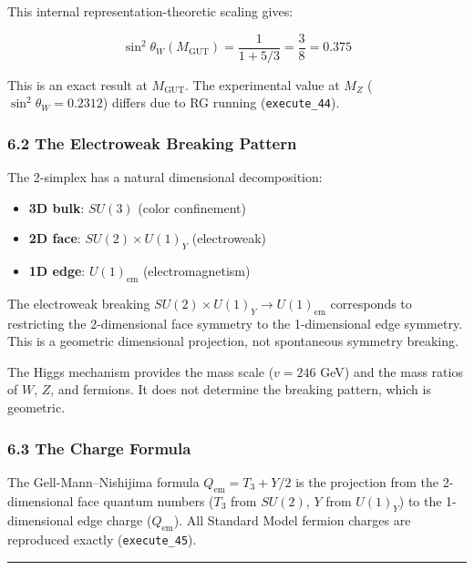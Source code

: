 \documentclass[
]{article}
\providecommand{\tightlist}{%
  \setlength{\itemsep}{0pt}\setlength{\parskip}{0pt}}
\begin{document}
This internal representation-theoretic scaling gives:

\[\sin^2\theta_W(M_{\mathrm{GUT}}) = \frac{1}{1 + 5/3} = \frac{3}{8} = 0.375\]

This is an exact result at \(M_{\mathrm{GUT}}\). The experimental value
at \(M_Z\) (\(\sin^2\theta_W = 0.2312\)) differs due to RG running
(\texttt{execute\_44}).

\hypertarget{the-electroweak-breaking-pattern}{%
\subsubsection{6.2 The Electroweak Breaking
Pattern}\label{the-electroweak-breaking-pattern}}

The 2-simplex has a natural dimensional decomposition:

\begin{itemize}
\tightlist
\item
  \textbf{3D bulk}: \(SU(3)\) (color confinement)
\item
  \textbf{2D face}: \(SU(2) \times U(1)_Y\) (electroweak)
\item
  \textbf{1D edge}: \(U(1)_{\mathrm{em}}\) (electromagnetism)
\end{itemize}

The electroweak breaking \(SU(2) \times U(1)_Y \to U(1)_{\mathrm{em}}\)
corresponds to restricting the 2-dimensional face symmetry to the
1-dimensional edge symmetry. This is a geometric dimensional projection,
not spontaneous symmetry breaking.

The Higgs mechanism provides the mass scale (\(v = 246\) GeV) and the
mass ratios of \(W\), \(Z\), and fermions. It does not determine the
breaking pattern, which is geometric.

\hypertarget{the-charge-formula}{%
\subsubsection{6.3 The Charge Formula}\label{the-charge-formula}}

The Gell-Mann--Nishijima formula \(Q_{\mathrm{em}} = T_3 + Y/2\) is the
projection from the 2-dimensional face quantum numbers (\(T_3\) from
\(SU(2)\), \(Y\) from \(U(1)_Y\)) to the 1-dimensional edge charge
(\(Q_{\mathrm{em}}\)). All Standard Model fermion charges are reproduced
exactly (\texttt{execute\_45}).

\begin{center}\rule{0.5\linewidth}{0.5pt}\end{center}
\end{document}
